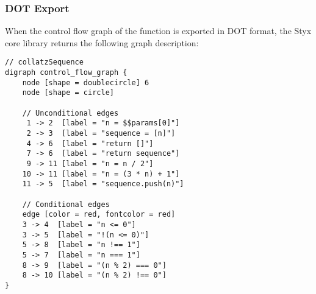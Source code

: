 \subsubsection{DOT Export}

When the control flow graph of the  function is exported in DOT format, the Styx core library returns the following graph description:

\vspace{0.15cm}

\begin{verbatim}
// collatzSequence
digraph control_flow_graph {
    node [shape = doublecircle] 6
    node [shape = circle]
    
    // Unconditional edges
     1 -> 2  [label = "n = $$params[0]"]
     2 -> 3  [label = "sequence = [n]"]
     4 -> 6  [label = "return []"]
     7 -> 6  [label = "return sequence"]
     9 -> 11 [label = "n = n / 2"]
    10 -> 11 [label = "n = (3 * n) + 1"]
    11 -> 5  [label = "sequence.push(n)"]
    
    // Conditional edges
    edge [color = red, fontcolor = red]
    3 -> 4  [label = "n <= 0"]
    3 -> 5  [label = "!(n <= 0)"]
    5 -> 8  [label = "n !== 1"]
    5 -> 7  [label = "n === 1"]
    8 -> 9  [label = "(n % 2) === 0"]
    8 -> 10 [label = "(n % 2) !== 0"]
}
\end{verbatim}
